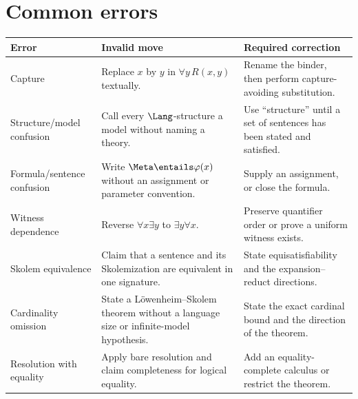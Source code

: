 \section{Common errors}
\label{sec:fol-cardinality-normalforms-05}

\begin{longtable}{@{}p{}p{}p{}@{}}
\toprule
Error & Invalid move & Required correction \\ \midrule
\endhead
Capture & Replace \(x\) by \(y\) in \(\forall y\,R(x,y)\) textually. &
Rename the binder, then perform capture-avoiding substitution. \\
\addlinespace
Structure/model confusion & Call every \(\Lang\)-structure a model without
naming a theory. & Use ``structure'' until a set of sentences has been stated
and satisfied. \\
\addlinespace
Formula/sentence confusion & Write \(\Meta\entails\varphi(x)\) without an
assignment or parameter convention. & Supply an assignment, or close the
formula. \\
\addlinespace
Witness dependence & Reverse \(\forall x\exists y\) to
\(\exists y\forall x\). & Preserve quantifier order or prove a uniform witness
exists. \\
\addlinespace
Skolem equivalence & Claim that a sentence and its Skolemization are
equivalent in one signature. & State equisatisfiability and the
expansion--reduct directions. \\
\addlinespace
Cardinality omission & State a L\"owenheim--Skolem theorem without a language
size or infinite-model hypothesis. & State the exact cardinal bound and the
direction of the theorem. \\
\addlinespace
Resolution with equality & Apply bare resolution and claim completeness for
logical equality. & Add an equality-complete calculus or restrict the theorem.
\\
\bottomrule
\end{longtable}

